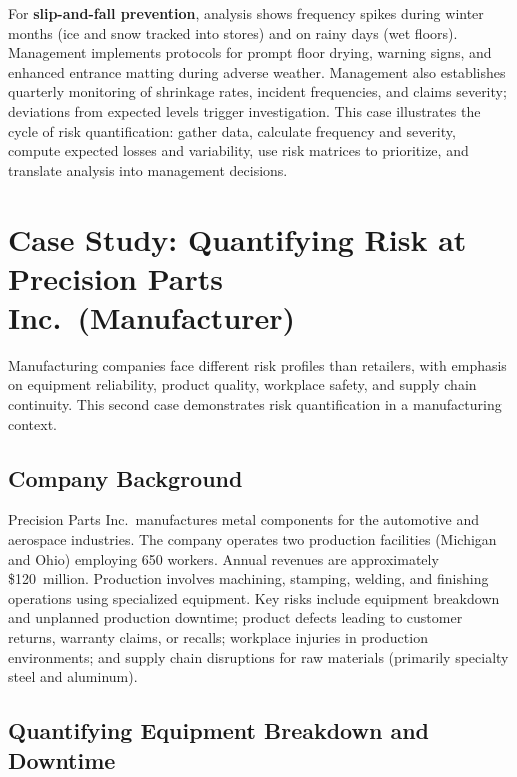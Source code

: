 \documentclass[11pt,openany]{book}
\begin{document}
For \textbf{slip-and-fall prevention}, analysis shows frequency spikes during
winter months (ice and snow tracked into stores) and on rainy days (wet
floors). Management implements protocols for prompt floor drying, warning signs,
and enhanced entrance matting during adverse weather. Management also
establishes quarterly monitoring of shrinkage rates, incident frequencies, and
claims severity; deviations from expected levels trigger investigation. This
case illustrates the cycle of risk quantification: gather data, calculate
frequency and severity, compute expected losses and variability, use risk
matrices to prioritize, and translate analysis into management decisions.

\section{Case Study: Quantifying Risk at Precision Parts Inc.\ (Manufacturer)}
\label{sec:precision-parts}

Manufacturing companies face different risk profiles than retailers, with
emphasis on equipment reliability, product quality, workplace safety, and
supply chain continuity. This second case demonstrates risk quantification in a
manufacturing context.

\subsection{Company Background}
\label{subsec:precision-background}

Precision Parts Inc.\ manufactures metal components for the automotive and
aerospace industries. The company operates two production facilities (Michigan
and Ohio) employing 650 workers. Annual revenues are approximately
\$120~million. Production involves machining, stamping, welding, and finishing
operations using specialized equipment. Key risks include equipment breakdown
and unplanned production downtime; product defects leading to customer returns,
warranty claims, or recalls; workplace injuries in production environments; and
supply chain disruptions for raw materials (primarily specialty steel and
aluminum).

\subsection{Quantifying Equipment Breakdown and Downtime}
\label{subsec:precision-equipment}
\end{document}
